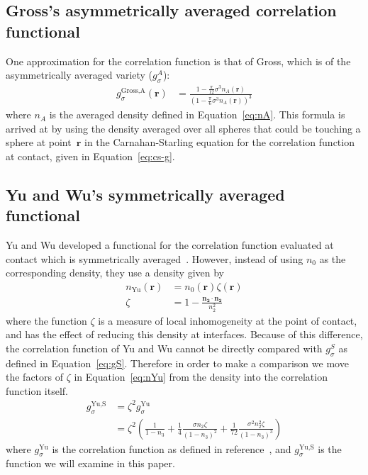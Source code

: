 \documentclass[letterpaper,twocolumn,amsmath,amssymb,pre]{revtex4-1}
\newcommand{\rr}{\textbf{r}}
\begin{document}
\subsection{Gross's asymmetrically averaged correlation functional}\label{sec:gross}
One approximation for the correlation function is that of
Gross\cite{gross2009density}, which is of the asymmetrically averaged
variety ($g_\sigma^A$):
\begin{align}
  g_\sigma^\text{Gross,A}(\rr) &= \frac{1 - \frac{\pi}{12}\sigma^3n_A(\rr)}{\left(1 -
    \frac{\pi}{6}\sigma^3n_A(\rr)\right)^3}
\end{align}
where $n_A$ is the averaged density defined in Equation~\ref{eq:nA}.
This formula is arrived at by using the density averaged over all
spheres that could be touching a sphere at point~$\rr$ in the
Carnahan-Starling equation for the correlation function at contact,
given in Equation~\ref{eq:cs-g}.

\subsection{Yu and Wu's symmetrically averaged functional}\label{sec:yuwu}

Yu and Wu developed a functional for the correlation function
evaluated at contact which is symmetrically
averaged~\cite{yu2002fmt-dft-inhomogeneous-associating}.  However,
instead of using $n_0$ as the corresponding density, they use a
density given by
\begin{align}
  n_\text{Yu}(\rr) &= n_0(\rr) \zeta(\rr) \label{eq:nYu} \\
  \zeta &= 1 - \frac{\mathbf{n_2}\cdot\mathbf{n_2}}{n_2^2} \label{eq:zeta}
\end{align}
where the function $\zeta$ is a measure of local inhomogeneity at the
point of contact, and has the effect of reducing this density at
interfaces.  Because of this difference, the correlation function of
Yu and Wu cannot be directly compared with $g_\sigma^S$ as defined in
Equation~\ref{eq:gS}.  Therefore in order to make a comparison we move
the factors of $\zeta$ in Equation~\ref{eq:nYu} from the density into
the correlation function itself.
\begin{align}
  g_\sigma^\text{Yu,S} &= \zeta^2 g_\sigma^\text{Yu} \\
   &= \zeta^2\left(\frac{1}{1-n_3}
    + \frac14 \frac{\sigma n_2\zeta}{(1-n_3)^2}
    + \frac1{72} \frac{\sigma^2 n_2^2 \zeta}{(1-n_3)^3}\right)
\end{align}
where $g_\sigma^\text{Yu}$ is the correlation function as defined in
reference~\cite{yu2002fmt-dft-inhomogeneous-associating}, and
$g_\sigma^\text{Yu,S}$ is the function we will examine in this paper.
\end{document}
